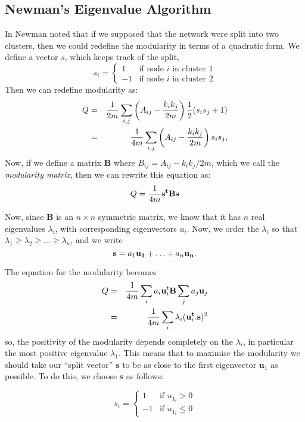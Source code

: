 \subsection{Newman's Eigenvalue Algorithm}

In \cite{Newman2006a} Newman noted that if we supposed that the network were 
split into two clusters, then we could redefine the modularity in terms of a
quadratic form.  We define a vector $s$, which keeps track of the
split,
$$
s_i = \left\{ \begin{array}{ll} 1 & \mbox{if node $i$ in cluster 1}
  \\ -1 & \mbox{if node $i$ in cluster 2}\end{array} \right.
$$
Then we can redefine modularity as:
\begin{eqnarray}
Q & = & \frac{1}{2m}\sum_{i,j} \left(A_{ij} - \frac{k_ik_j}{2m}\right)\frac{1}{2}(s_is_j + 1)\cr
& = &\frac{1}{4m}\sum_{i,j} \left(A_{ij} - \frac{k_ik_j}{2m}\right)s_is_j,
\end{eqnarray}
Now, if we define a matrix $\mathbf{B}$ where 
$B_{ij} = A_{ij} - k_ik_j/2m$, which we call the {\sl modularity matrix}, 
then we can rewrite this equation as:
\begin{equation}
Q = \frac{1}{4m}{\bf s^tBs}
\end{equation}

Now, since $\mathbf{B}$ is an $n\times n$ symmetric matrix, we know that
it has $n$ real eigenvalues $\lambda_i$, with corresponding
eigenvectors $u_i$.  Now, we order the $\lambda_i$ so that $
\lambda_1 \geq \lambda_2 \geq \ldots \geq \lambda_n$, and we write 
$$
{\bf s} = a_1{\bf u_1}+ \ldots + a_n{\bf u_n}.
$$


The equation for the modularity becomes
\begin{eqnarray}
Q & = & \frac{1}{4m} \sum_{i} a_i{\bf u}_i^t{\bf B}\sum_ja_j{\bf u}_j\cr
& = & \frac{1}{4m} \sum_i \lambda_i ({\bf u}_i^{\bf t}.{\bf s})^2
\end{eqnarray}
so, the positivity of the modularity depends completely on the $\lambda_i$, in 
particular the most positive eigenvalue $\lambda_1$.  This means that to 
maximise the modularity we should take our ``split vector'' $\mathbf{s}$ to be 
as close to the first eigenvector $\mathbf{u}_1$ as possible. To do this, we 
choose $\mathbf{s}$ as follows:

\begin{equation}
s_i =\left\{ \begin{array}{ll} 1 & \mbox{if } u_{1_i}>0 \\
-1 & \mbox{if } u_{1_i}\leq0 \end{array} \right.
\end{equation}

